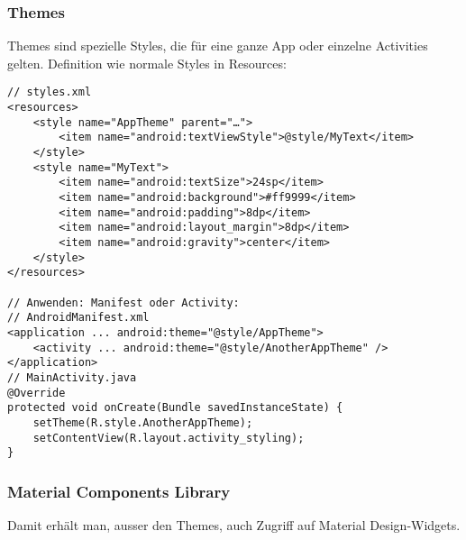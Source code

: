 \subsubsection{Themes}
Themes sind spezielle Styles, die für eine ganze App oder einzelne Activities gelten. Definition wie normale Styles in Resources:
\begin{lstlisting}
// styles.xml
<resources>
    <style name="AppTheme" parent="…">
        <item name="android:textViewStyle">@style/MyText</item>
    </style>
    <style name="MyText">
        <item name="android:textSize">24sp</item>
        <item name="android:background">#ff9999</item>
        <item name="android:padding">8dp</item>
        <item name="android:layout_margin">8dp</item>
        <item name="android:gravity">center</item>
    </style>
</resources>

// Anwenden: Manifest oder Activity:
// AndroidManifest.xml
<application ... android:theme="@style/AppTheme">
    <activity ... android:theme="@style/AnotherAppTheme" />
</application>
// MainActivity.java
@Override
protected void onCreate(Bundle savedInstanceState) {
    setTheme(R.style.AnotherAppTheme);
    setContentView(R.layout.activity_styling);
}
\end{lstlisting}
\subsubsection{Material Components Library}
Damit erhält man, ausser den Themes, auch Zugriff auf Material Design-Widgets.